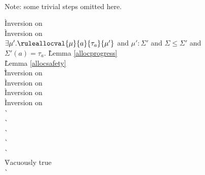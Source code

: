 \begin{description}
\item[] \ \\
  Note: some trivial steps omitted here.
  \begin{tabbing}
    \` Inversion on  \\
    \` Inversion on  \\
  $\exists \mu' . \ruleallocval{\mu}{a}{\tau_a}{\mu'}$ and $\mu' : \Sigma'$ and $\Sigma \le \Sigma'$ and $\Sigma'(a) = \tau_a$.
    \` Lemma \ref{allocprogress} \\
   \` Lemma \ref{allocsafety} \\
   \`
    \` Inversion on  \\
    \` Inversion on  \\
    \` Inversion on  \\
    \` Inversion on  \\
   \`  \\
   \`  \\
   \`  \\
   \`  \\
   \`  \\
    \` Vacuously true \\
   \`  \\
  \end{tabbing}


\end{description}
